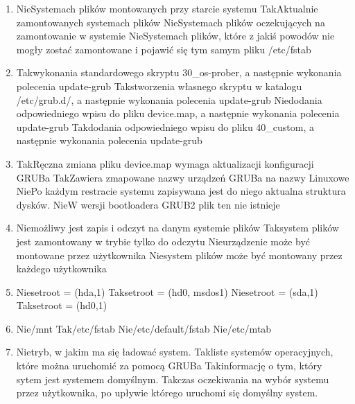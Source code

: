 \begin{enumerate}
	\item {}
	{Nie}{Systemach plików montowanych przy starcie systemu}
	{Tak}{Aktualnie zamontowanych systemach plików}
	{Nie}{Systemach plików oczekujących na zamontowanie w systemie}
	{Nie}{Systemach plików, które z jakiś powodów nie mogły zostać zamontowane i pojawić się tym samym pliku /etc/fstab}
	
	\newpage
	
	\item {}
	{Tak}{wykonania standardowego skryptu 30\_os-prober, a następnie wykonania polecenia update-grub}
	{Tak}{stworzenia własnego skryptu w katalogu /etc/grub.d/, a następnie wykonania polecenia update-grub}
	{Nie}{dodania odpowiedniego wpisu do pliku device.map, a następnie wykonania polecenia update-grub}
	{Tak}{dodania odpowiedniego wpisu do pliku 40\_custom, a następnie wykonania polecenia update-grub}
	
	\item {}
	{Tak}{Ręczna zmiana pliku device.map wymaga aktualizacji konfiguracji GRUBa}
	{Tak}{Zawiera zmapowane nazwy urządzeń GRUBa na nazwy Linuxowe}
	{Nie}{Po każdym restracie systemu zapisywana jest do niego aktualna struktura dysków.}
	{Nie}{W wersji bootloadera GRUB2 plik ten nie istnieje}
	
	\item {}
	{Nie}{możliwy jest zapis i odczyt na danym systemie plików}
	{Tak}{system plików jest zamontowany w trybie tylko do odczytu}
	{Nie}{urządzenie może być montowane przez użytkownika}
	{Nie}{system plików może być montowany przez każdego użytkownika}
	
	\item {}
	{Nie}{setroot = (hda,1)}
	{Tak}{setroot = (hd0, msdos1)}
	{Nie}{setroot = (sda,1)}
	{Tak}{setroot = (hd0,1)}
	
	\item {}
	{Nie}{/mnt}
	{Tak}{/etc/fstab}
	{Nie}{/etc/default/fstab}
	{Nie}{/etc/mtab}
	
	\item {}
	{Nie}{tryb, w jakim ma się ładować system.}
	{Tak}{liste systemów operacyjnych, które można uruchomić za pomocą GRUBa}
	{Tak}{informację o tym, który sytem jest systemem domyślnym.}
	{Tak}{czas oczekiwania na wybór systemu przez użytkownika, po upływie którego uruchomi się domyślny system.}
	

\end{enumerate}
